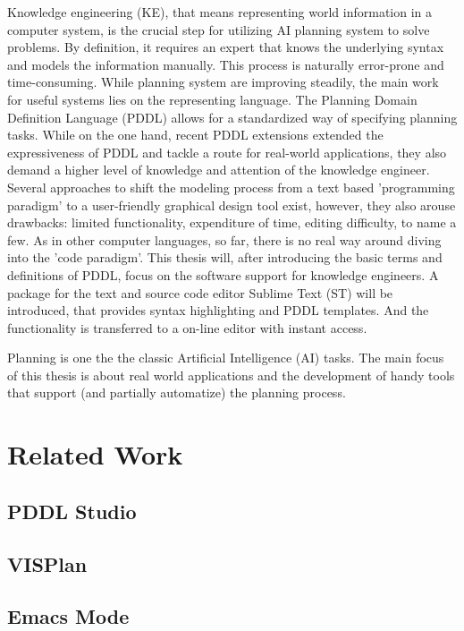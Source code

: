 \documentclass[11pt]{article}
\begin{document}
Knowledge engineering (KE), that means representing world information
in a computer system, is the crucial step for utilizing AI planning
system to solve problems. By definition, it requires an expert that
knows the underlying syntax and models the information manually. This
process is naturally error-prone and time-consuming. While planning
system are improving steadily, the main work for useful systems lies
on the representing language. The Planning Domain Definition Language
(PDDL) \parencite{mcdermott1998pddl} allows for a standardized way of
specifying planning tasks. While on the one hand, recent PDDL extensions
\parencite{fox2003pddl2,kovacs2011bnf} extended the expressiveness of
PDDL and tackle a route for real-world applications, they also demand
a higher level of knowledge and attention of the knowledge engineer.
Several approaches to shift the modeling process from a text based
'programming paradigm' to a user-friendly graphical design tool exist,
however, they also arouse drawbacks: limited functionality,
expenditure of time, editing difficulty, to name a few. As in other
computer languages, so far, there is no real way around diving into
the 'code paradigm'. 
This thesis will, after introducing the basic terms and definitions of
PDDL, focus on the software support for knowledge engineers. A package
for the text and source code editor Sublime Text (ST) will be
introduced, that provides syntax highlighting and PDDL templates. And
the functionality is transferred to a on-line editor with instant access. 

Planning is one the the classic Artificial Intelligence (AI) tasks.
The main focus of this thesis is about real world applications and the
development of handy tools that support (and partially automatize) the
planning process. 
\section{Related Work}
\label{sec-2}
\subsection{PDDL Studio}
\label{sec-2-1}
\subsection{VISPlan}
\label{sec-2-2}

\subsection{Emacs Mode}
\label{sec-2-3}
\end{document}
